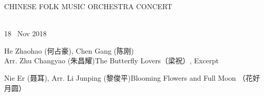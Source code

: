 \documentclass[letter,6pt,poets]{ConcProg}
\begin{document}

\begin{spacing}{1.0} 
\begin{center}
\Huge{C}\large{HINESE } \Huge{F}\large{OLK} \Huge{M}\large{USIC} \Huge{O}\large{RCHESTRA} \Huge{C}\LARGE{ONCERT}
\end{center}
\begin{programme}{
\\  {\normalsize 18 ~Nov 2018}
}
  \begin{part}[]
    \begin{composition}{He Zhaohao (何占豪), Chen Gang (陈刚) \\Arr. Zhu Changyao (朱昌耀)}{}{The Butterfly Lovers（梁祝）, Excerpt}{}
    \end{composition}
    
    \begin{composition}{Nie Er (聂耳), Arr. Li Junping (黎俊平)}{}{Blooming Flowers and Full Moon （花好月圆）}{}      
    \end{composition}
    

\end{part}
\end{programme}
\end{spacing}
\end{document}
